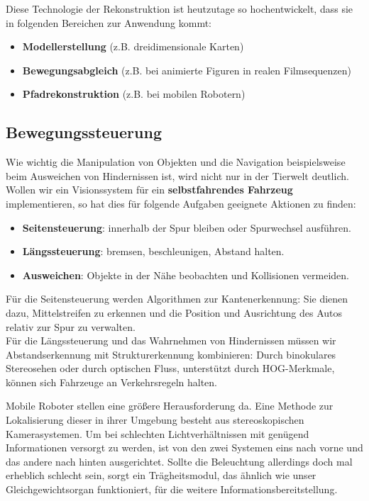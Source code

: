 Diese Technologie der Rekonstruktion ist heutzutage so hochentwickelt, dass sie in folgenden Bereichen zur Anwendung kommt:
\begin{itemize}
  \item \textbf{Modellerstellung} (z.B. dreidimensionale Karten)
  \item \textbf{Bewegungsabgleich} (z.B. bei animierte Figuren in realen Filmsequenzen)
  \item \textbf{Pfadrekonstruktion} (z.B. bei mobilen Robotern)
\end{itemize}


\subsection{Bewegungssteuerung}
Wie wichtig die Manipulation von Objekten und die Navigation beispielsweise beim Ausweichen von Hindernissen ist, wird nicht nur in der Tierwelt deutlich. Wollen wir ein Visionssystem für ein \textbf{selbstfahrendes Fahrzeug} implementieren, so hat dies für folgende Aufgaben geeignete Aktionen zu finden:
\begin{itemize}
  \item \textbf{Seitensteuerung}: innerhalb der Spur bleiben oder Spurwechsel ausführen.
  \item \textbf{Längssteuerung}: bremsen, beschleunigen, Abstand halten.
  \item \textbf{Ausweichen}: Objekte in der Nähe beobachten und Kollisionen vermeiden.
\end{itemize}
Für die Seitensteuerung werden Algorithmen zur Kantenerkennung: Sie dienen dazu, Mittelstreifen zu erkennen und die Position und Ausrichtung des Autos relativ zur Spur zu verwalten.\\
Für die Längssteuerung und das Wahrnehmen von Hindernissen müssen wir Abstandserkennung mit Strukturerkennung kombinieren: Durch binokulares Stereosehen oder durch optischen Fluss, unterstützt durch HOG-Merkmale, können sich Fahrzeuge an Verkehrsregeln halten.

Mobile Roboter stellen eine größere Herausforderung da. Eine Methode zur Lokalisierung dieser in ihrer Umgebung besteht aus stereoskopischen Kamerasystemen. Um bei schlechten Lichtverhältnissen mit genügend Informationen versorgt zu werden, ist von den zwei Systemen eins nach vorne und das andere nach hinten ausgerichtet. Sollte die Beleuchtung allerdings doch mal erheblich schlecht sein, sorgt ein Trägheitsmodul, das ähnlich wie unser Gleichgewichtsorgan funktioniert, für die weitere Informationsbereitstellung.

